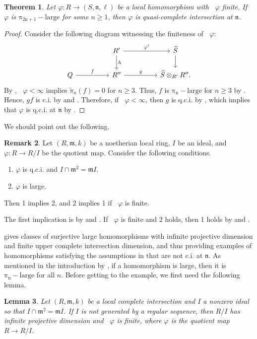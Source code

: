 \documentclass{amsart}
\newtheorem{theorem}{Theorem}[section]
\newtheorem{lemma}[theorem]{Lemma}
\theoremstyle{definition}
\newtheorem{remark}[theorem]{Remark}
\DeclareMathOperator{\uppercidim}{CI^{*}dim}
\newcommand{\m}{\mathfrak{m}}
\newcommand{\n}{\mathfrak{n}}
\newcommand{\wpi}{\widetilde{\pi}}
\newcommand{\pil}[1]{\operatorname{\pi_{#1}-large}}
\begin{document}
\begin{theorem} \label{T_UpperPiDimTheorem} Let $\varphi\colon R\rightarrow (S,\n,\ell)$ be a local homomorphism with $\uppercidim{\varphi}$ finite. If $\varphi$ is $\pil{2n+1}$ for some $n\geq 1$, then $\varphi$ is quasi-complete intersection at $\n$.
\end{theorem}

\begin{proof}
Consider the following diagram witnessing the finiteness of $\uppercidim{\varphi}$:
\[\begin{tikzcd}
	&& {R'} && {\widehat{S}} \\
	Q && {R''} && {\widehat{S}\otimes_{R'}R''.}
	\arrow["{\varphi'}", from=1-3, to=1-5]
	\arrow["h", from=1-3, to=2-3]
	\arrow[from=1-5, to=2-5]
	\arrow["f", from=2-1, to=2-3]
	\arrow["g", from=2-3, to=2-5]
\end{tikzcd}\]
By , $\uppercidim{\varphi}<\infty$ implies $\wpi_{n}(f)=0$ for $n\geq 3$. Thus, $f$ is $\pil{n}$ for $n \geq 3$ by . Hence, $gf$ is c.i. by  and . Therefore, if $\uppercidim{\varphi} < \infty$, then $g$ is q.c.i. by \cite[8.9.1]{Avramov/Henriques/Sega:2013}, which implies that $\varphi$ is q.c.i. at $\n$ by \cite[8.7]{Avramov/Henriques/Sega:2013}.
\end{proof}


We should point out the following.
\begin{remark} Let $(R,\m,k)$ be a noetherian local ring, $I$ be an ideal, and $\varphi\colon R\rightarrow R/I$ be the quotient map. Consider the following conditions.
\begin{enumerate}
    \item $\varphi$ is q.c.i. and $I\cap \m^{2}=\m I$.
    \item $\varphi$ is large.
\end{enumerate}
Then 1 implies 2, and 2 implies 1 if $\uppercidim{\varphi}$ is finite.

The first implication is by \cite[Theorem 6.2]{Avramov/Henriques/Sega:2013} and \cite[Example 2.4.4]{Gheibi/Takahashi:2021}. If $\uppercidim{\varphi}$ is finite and 2 holds, then 1 holds by  and \cite[2.3]{Gheibi/Takahashi:2021}.
\end{remark}


 gives classes of surjective large homomorphisms with infinite projective dimension and finite upper complete intersection dimension, and thus providing examples of homomorphisms satisfying the assumptions in  that are not c.i. at $\n$. As mentioned in the introduction by \cite[Example 7]{Briggs:2018}, if a homomorphism is large, then it is $\pil{n}$ for all $n$. Before getting to the example, we first need the following lemma.
\begin{lemma} \label{L_LemmaForNontrivialExample} Let $(R,\m,k)$ be a local complete intersection and $I$ a nonzero ideal so that $I\cap \m^{2}=\m I$. If $I$ is not generated by a regular sequence, then $R/I$ has infinite projective dimension and $\uppercidim{\varphi}$ is finite, where $\varphi$ is the quotient map $R\rightarrow R/I$.
\end{lemma}
\end{document}
